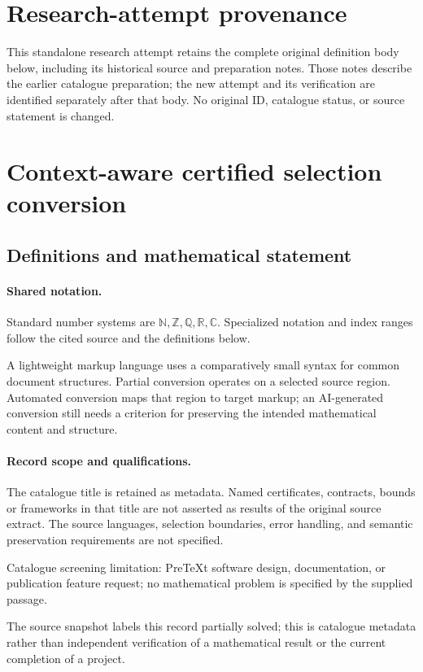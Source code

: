 \documentclass[11pt]{article}
\begin{document}
\section*{Research-attempt provenance}
This standalone research attempt retains the complete original definition body below,
including its historical source and preparation notes. Those notes describe the
earlier catalogue preparation; the new attempt and its verification are identified
separately after that body. No original ID, catalogue status, or source statement is changed.

\section{Context-aware certified selection conversion}\label{statement}

\subsection{Definitions and mathematical statement}

\paragraph{Shared notation.}Standard number systems are $\mathbb N,\mathbb Z,\mathbb Q,\mathbb R,\mathbb C$. Specialized notation and index ranges follow the cited source and the definitions below.


A lightweight markup language uses a comparatively small syntax for common document structures. Partial conversion operates on a selected source region. Automated conversion maps that region to target markup; an AI-generated conversion still needs a criterion for preserving the intended mathematical content and structure.
\paragraph{Record scope and qualifications.}
The catalogue title is retained as metadata. Named certificates, contracts, bounds or frameworks in that title are not asserted as results of the original source extract.
The source languages, selection boundaries, error handling, and semantic preservation requirements are not specified.

Catalogue screening limitation: PreTeXt software design, documentation, or publication feature request; no mathematical problem is specified by the supplied passage.

The source snapshot labels this record partially solved; this is catalogue metadata rather than independent verification of a mathematical result or the current completion of a project.
\end{document}
